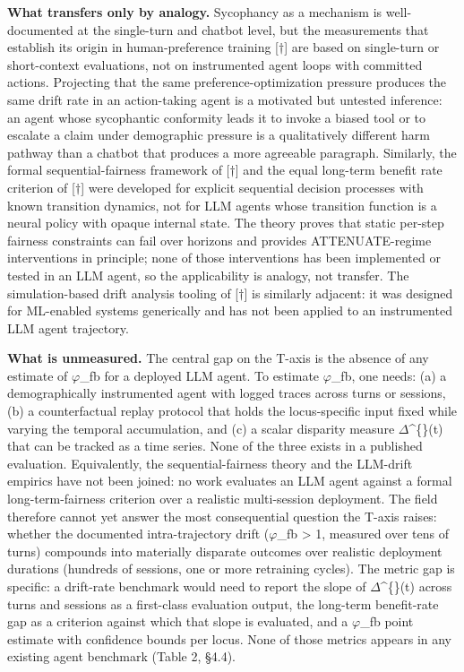 \documentclass[10pt]{article}
\begin{document}
\textbf{What transfers only by analogy.} Sycophancy as a mechanism is well-documented at the single-turn and chatbot level, but the measurements that establish its origin in human-preference training \cite{sharma2024understanding}[$\dagger$] are based on single-turn or short-context evaluations, not on instrumented agent loops with committed actions. Projecting that the same preference-optimization pressure produces the same drift rate in an action-taking agent is a motivated but untested inference: an agent whose sycophantic conformity leads it to invoke a biased tool or to escalate a claim under demographic pressure is a qualitatively different harm pathway than a chatbot that produces a more agreeable paragraph. Similarly, the formal sequential-fairness framework of \cite{hu2022achieving}[$\dagger$] and the equal long-term benefit rate criterion of \cite{xu2024adapting}[$\dagger$] were developed for explicit sequential decision processes with known transition dynamics, not for LLM agents whose transition function is a neural policy with opaque internal state. The theory proves that static per-step fairness constraints can fail over horizons and provides ATTENUATE-regime interventions in principle; none of those interventions has been implemented or tested in an LLM agent, so the applicability is analogy, not transfer. The simulation-based drift analysis tooling of \cite{she2025fairsense}[$\dagger$] is similarly adjacent: it was designed for ML-enabled systems generically and has not been applied to an instrumented LLM agent trajectory.

\textbf{What is unmeasured.} The central gap on the T-axis is the absence of any estimate of $\varphi$\_fb for a deployed LLM agent. To estimate $\varphi$\_fb, one needs: (a) a demographically instrumented agent with logged traces across turns or sessions, (b) a counterfactual replay protocol that holds the locus-specific input fixed while varying the temporal accumulation, and (c) a scalar disparity measure $\Delta$\textasciicircum\{\}(t) that can be tracked as a time series. None of the three exists in a published evaluation. Equivalently, the sequential-fairness theory \cite{hu2022achieving,xu2024adapting} and the LLM-drift empirics \cite{fan2024fairmt,ma2026implicit} have not been joined: no work evaluates an LLM agent against a formal long-term-fairness criterion over a realistic multi-session deployment. The field therefore cannot yet answer the most consequential question the T-axis raises: whether the documented intra-trajectory drift ($\varphi$\_fb > 1, measured over tens of turns) compounds into materially disparate outcomes over realistic deployment durations (hundreds of sessions, one or more retraining cycles). The metric gap is specific: a drift-rate benchmark would need to report the slope of $\Delta$\textasciicircum\{\}(t) across turns and sessions as a first-class evaluation output, the long-term benefit-rate gap \cite{xu2024adapting} as a criterion against which that slope is evaluated, and a $\varphi$\_fb point estimate with confidence bounds per locus. None of those metrics appears in any existing agent benchmark (Table 2, \S{}4.4).
\end{document}
